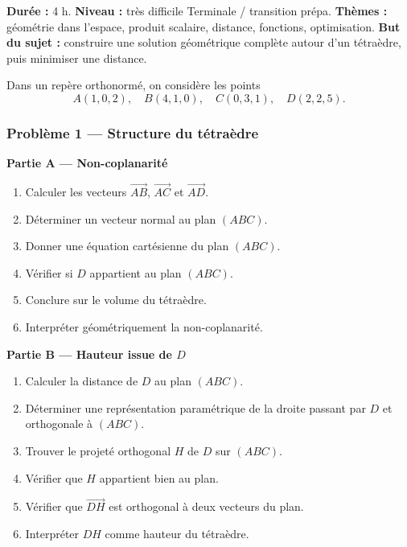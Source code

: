 \documentclass[11pt,a4paper]{article}
\begin{document}
\hypertarget{M-EXCELLENCE-03}{}
\begin{difficile}
\textbf{Durée :} 4 h.  
\textbf{Niveau :} très difficile Terminale / transition prépa.  
\textbf{Thèmes :} géométrie dans l'espace, produit scalaire, distance, fonctions, optimisation.  
\textbf{But du sujet :} construire une solution géométrique complète autour d'un tétraèdre, puis minimiser une distance.

\medskip

Dans un repère orthonormé, on considère les points
\[
A(1,0,2),\quad B(4,1,0),\quad C(0,3,1),\quad D(2,2,5).
\]

\subsubsection*{Problème 1 — Structure du tétraèdre}

\textbf{Partie A — Non-coplanarité}
\begin{enumerate}
  \item Calculer les vecteurs $\overrightarrow{AB}$, $\overrightarrow{AC}$ et $\overrightarrow{AD}$.
  \item Déterminer un vecteur normal au plan $(ABC)$.
  \item Donner une équation cartésienne du plan $(ABC)$.
  \item Vérifier si $D$ appartient au plan $(ABC)$.
  \item Conclure sur le volume du tétraèdre.
  \item Interpréter géométriquement la non-coplanarité.
\end{enumerate}

\textbf{Partie B — Hauteur issue de $D$}
\begin{enumerate}
  \item Calculer la distance de $D$ au plan $(ABC)$.
  \item Déterminer une représentation paramétrique de la droite passant par $D$ et orthogonale à $(ABC)$.
  \item Trouver le projeté orthogonal $H$ de $D$ sur $(ABC)$.
  \item Vérifier que $H$ appartient bien au plan.
  \item Vérifier que $\overrightarrow{DH}$ est orthogonal à deux vecteurs du plan.
  \item Interpréter $DH$ comme hauteur du tétraèdre.
\end{enumerate}


\end{difficile}
\end{document}
